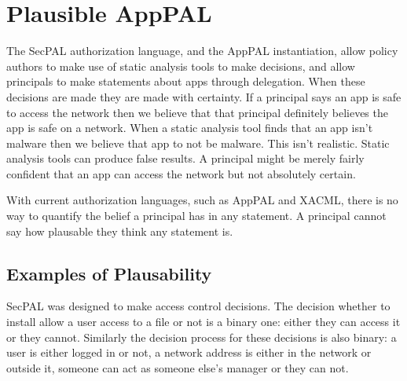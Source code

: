 \documentclass[thesis.tex]{subfiles}
\begin{document}
\section{Plausible AppPAL}

\newcommand{\secpalmath}[1]{\ensuremath\texttt{#1}}
\newcommand{\AC}[0]{\ensuremath\text{AC}}
\newcommand{\says}[1]{\ensuremath~\secpalmath{says}^{\new{#1}}~}
\newcommand{\canSay}[1]{\secpalmath{can-say}_{#1}}
\newcommand{\canActAs}[0]{\secpalmath{can-act-as}}
\newcommand{\spif}[0]{\secpalmath{if}}
\newcommand{\where}[0]{\secpalmath{where}}

The SecPAL authorization language, and the AppPAL instantiation, allow
policy authors to make use of static analysis tools to make decisions,
and allow principals to make statements about apps through delegation.
When these decisions are made they are made with certainty.  If a
principal says an app is safe to access the network then we believe
that that principal definitely believes the app is safe on a network.
When a static analysis tool finds that an app isn't malware then we
believe that app to not be malware.  This isn't realistic.  Static
analysis tools can produce false results.  A principal might be merely
fairly confident that an app can access the network but not absolutely
certain.

With current authorization languages, such as AppPAL and XACML, there
is no way to quantify the belief a principal has in any statement.  A
principal cannot say how plausable they think any statement is.

\subsection{Examples of Plausability}

SecPAL was designed to make access control decisions.  The decision
whether to install allow a user access to a file or not is a binary
one: either they can access it or they cannot.  Similarly the decision
process for these decisions is also binary: a user is either logged in
or not, a network address is either in the network or outside it,
someone can act as someone else's manager or they can not.
\end{document}
